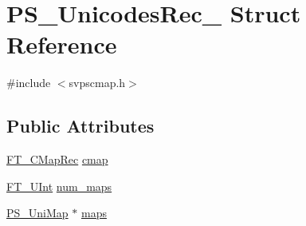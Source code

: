\hypertarget{struct_p_s___unicodes_rec__}{\section{P\-S\-\_\-\-Unicodes\-Rec\-\_\- Struct Reference}
\label{struct_p_s___unicodes_rec__}
}


{\ttfamily \#include $<$svpscmap.\-h$>$}

\subsection*{Public Attributes}
\begin{DoxyCompactItemize}
\item 
\hyperlink{ftobjs_8h_a5cc72b1bc37564a223b23a84f3c8d0b8}{F\-T\-\_\-\-C\-Map\-Rec} \hyperlink{struct_p_s___unicodes_rec___a4c3e28cb86c8a7039107437dcf995da7}{cmap}
\item 
\hyperlink{fttypes_8h_abcb8db4dbf35d2b55a9e8c7b0926dc52}{F\-T\-\_\-\-U\-Int} \hyperlink{struct_p_s___unicodes_rec___abbc3617f13363ddcf851ee229752b08d}{num\-\_\-maps}
\item 
\hyperlink{svpscmap_8h_a1756f07ad047fe50bbee9c2520b9a8e5}{P\-S\-\_\-\-Uni\-Map} $\ast$ \hyperlink{struct_p_s___unicodes_rec___abd0ff1abe19a2a6a838b631ec81d22cd}{maps}
\end{DoxyCompactItemize}


